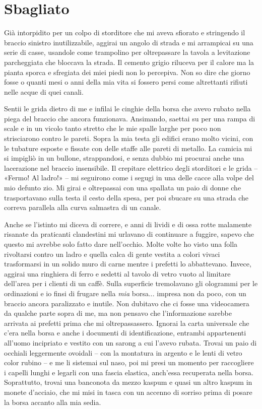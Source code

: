 \chapter{Sbagliato}

Già intorpidito per un colpo di storditore che mi aveva sfiorato e
stringendo il braccio sinistro inutilizzabile, aggirai un angolo di
strada e mi arrampicai su una serie di casse, usandole come trampolino
per oltrepassare la tavola a levitazione parcheggiata che bloccava la
strada. Il cemento grigio riluceva per il calore ma la pianta sporca e
sfregiata dei miei piedi non lo percepiva. Non so dire che giorno fosse
o quanti mesi o anni della mia vita si fossero persi come altrettanti
rifiuti nelle acque di quei canali.

Sentii le grida dietro di me e infilai le cinghie della borsa che avevo
rubato nella piega del braccio che ancora funzionava. Ansimando, saettai
su per una rampa di scale e in un vicolo tanto stretto che le mie spalle
larghe per poco non strisciarono contro le pareti. Sopra la mia testa
gli edifici erano molto vicini, con le tubature esposte e fissate con
delle staffe alle pareti di metallo. La camicia mi si impigliò in un
bullone, strappandosi, e senza dubbio mi procurai anche una lacerazione
nel braccio insensibile. Il crepitare elettrico degli storditori e le
grida -- «Fermo! Al ladro!» -- mi seguirono come i segugi in una delle
cacce alla volpe del mio defunto zio. Mi girai e oltrepassai con una
spallata un paio di donne che trasportavano sulla testa il cesto della
spesa, per poi sbucare su una strada che correva parallela alla curva
salmastra di un canale.

Anche se l'istinto mi diceva di correre, e anni di lividi e di ossa
rotte malamente risanate da praticanti clandestini mi urlavano di
continuare a fuggire, sapevo che questo mi avrebbe solo fatto dare
nell'occhio. Molte volte ho visto una folla rivoltarsi contro un ladro e
quella calca di gente vestita a colori vivaci trasformarsi in un solido
muro di carne mentre i prefetti lo abbattevano. Invece, aggirai una
ringhiera di ferro e sedetti al tavolo di vetro vuoto al limitare
dell'area per i clienti di un caffè. Sulla superficie tremolavano gli
ologrammi per le ordinazioni e io finsi di frugare nella \emph{mia}
borsa... impresa non da poco, con un braccio ancora paralizzato e
inutile. Non dubitavo che ci fosse una videocamera da qualche parte
sopra di me, ma non pensavo che l'informazione sarebbe arrivata ai
prefetti prima che mi oltrepassassero. Ignorai la carta universale che
c'era nella borsa e anche i documenti di identificazione, entrambi
appartenenti all'uomo incipriato e vestito con un sarong a cui l'avevo
rubata. Trovai un paio di occhiali leggermente ovoidali -- con la
montatura in argento e le lenti di vetro color rubino -- e me li
sistemai sul naso, poi mi presi un momento per raccogliere i capelli
lunghi e legarli con una fascia elastica, anch'essa recuperata nella
borsa. Soprattutto, trovai una banconota da mezzo kaspum e quasi un
altro kaspum in monete d'acciaio, che mi misi in tasca con un accenno di
sorriso prima di posare la borsa accanto alla mia sedia.

